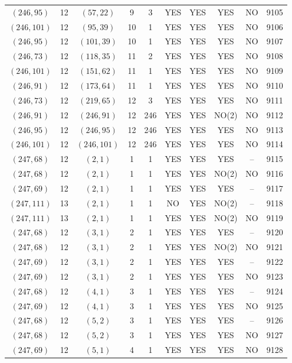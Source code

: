 \begin{longtable}{|c|c|c|c|c|c|c|c|c|c|}
$(246, 95)$ & 12 & $(57, 22)$ & 9 & 3 & YES & YES & YES & NO & 9105\\
$(246, 101)$ & 12 & $(95, 39)$ & 10 & 1 & YES & YES & YES & NO & 9106\\
$(246, 95)$ & 12 & $(101, 39)$ & 10 & 1 & YES & YES & YES & NO & 9107\\
$(246, 73)$ & 12 & $(118, 35)$ & 11 & 2 & YES & YES & YES & NO & 9108\\
$(246, 101)$ & 12 & $(151, 62)$ & 11 & 1 & YES & YES & YES & NO & 9109\\
$(246, 91)$ & 12 & $(173, 64)$ & 11 & 1 & YES & YES & YES & NO & 9110\\
$(246, 73)$ & 12 & $(219, 65)$ & 12 & 3 & YES & YES & YES & NO & 9111\\
$(246, 91)$ & 12 & $(246, 91)$ & 12 & 246 & YES & YES & NO(2) & NO & 9112\\
$(246, 95)$ & 12 & $(246, 95)$ & 12 & 246 & YES & YES & YES & NO & 9113\\
$(246, 101)$ & 12 & $(246, 101)$ & 12 & 246 & YES & YES & YES & NO & 9114\\
$(247, 68)$ & 12 & $(2, 1)$ & 1 & 1 & YES & YES & YES & -- & 9115\\
$(247, 68)$ & 12 & $(2, 1)$ & 1 & 1 & YES & YES & NO(2) & NO & 9116\\
$(247, 69)$ & 12 & $(2, 1)$ & 1 & 1 & YES & YES & YES & -- & 9117\\
$(247, 111)$ & 13 & $(2, 1)$ & 1 & 1 & NO & YES & NO(2) & -- & 9118\\
$(247, 111)$ & 13 & $(2, 1)$ & 1 & 1 & YES & YES & NO(2) & NO & 9119\\
$(247, 68)$ & 12 & $(3, 1)$ & 2 & 1 & YES & YES & YES & -- & 9120\\
$(247, 68)$ & 12 & $(3, 1)$ & 2 & 1 & YES & YES & NO(2) & NO & 9121\\
$(247, 69)$ & 12 & $(3, 1)$ & 2 & 1 & YES & YES & YES & -- & 9122\\
$(247, 69)$ & 12 & $(3, 1)$ & 2 & 1 & YES & YES & YES & NO & 9123\\
$(247, 68)$ & 12 & $(4, 1)$ & 3 & 1 & YES & YES & YES & -- & 9124\\
$(247, 69)$ & 12 & $(4, 1)$ & 3 & 1 & YES & YES & YES & NO & 9125\\
$(247, 68)$ & 12 & $(5, 2)$ & 3 & 1 & YES & YES & YES & -- & 9126\\
$(247, 68)$ & 12 & $(5, 2)$ & 3 & 1 & YES & YES & YES & NO & 9127\\
$(247, 69)$ & 12 & $(5, 1)$ & 4 & 1 & YES & YES & YES & NO & 9128\\

\end{longtable}
